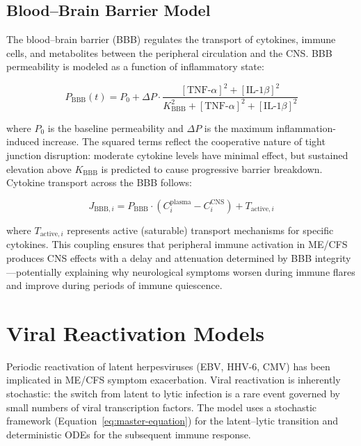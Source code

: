 \subsection{Blood--Brain Barrier Model}
\label{sec:bbb-model}

The blood--brain barrier (BBB) regulates the transport of cytokines, immune cells, and metabolites between the peripheral circulation and the CNS. BBB permeability is modeled as a function of inflammatory state:

\begin{equation}
\label{eq:bbb-permeability}
P_{\text{BBB}}(t) = P_0 + \Delta P \cdot \frac{[\text{TNF-}\alpha]^2 + [\text{IL-1}\beta]^2}{K_{\text{BBB}}^2 + [\text{TNF-}\alpha]^2 + [\text{IL-1}\beta]^2}
\end{equation}

where $P_0$ is the baseline permeability and $\Delta P$ is the maximum inflammation-induced increase. The squared terms reflect the cooperative nature of tight junction disruption: moderate cytokine levels have minimal effect, but sustained elevation above $K_{\text{BBB}}$ is predicted to cause progressive barrier breakdown. Cytokine transport across the BBB follows:

\begin{equation}
\label{eq:bbb-transport}
J_{\text{BBB},i} = P_{\text{BBB}} \cdot (C_i^{\text{plasma}} - C_i^{\text{CNS}}) + T_{\text{active},i}
\end{equation}

where $T_{\text{active},i}$ represents active (saturable) transport mechanisms for specific cytokines. This coupling ensures that peripheral immune activation in ME/CFS produces CNS effects with a delay and attenuation determined by BBB integrity---potentially explaining why neurological symptoms worsen during immune flares and improve during periods of immune quiescence.

\section{Viral Reactivation Models}
\label{sec:viral-reactivation-models}

Periodic reactivation of latent herpesviruses (EBV, HHV-6, CMV) has been implicated in ME/CFS symptom exacerbation. Viral reactivation is inherently stochastic: the switch from latent to lytic infection is a rare event governed by small numbers of viral transcription factors. The model uses a stochastic framework (Equation~\ref{eq:master-equation}) for the latent--lytic transition and deterministic ODEs for the subsequent immune response.

